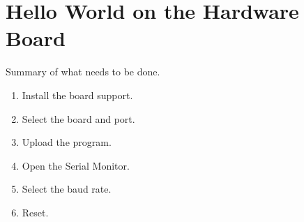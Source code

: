 \section{Hello World on the Hardware Board}

Summary of what needs to be done.
\begin{enumerate}
\item Install the board support.
\item Select the board and port.
\item Upload the program.
\item Open the Serial Monitor.
\item Select the baud rate.
\item Reset.
\end{enumerate}

